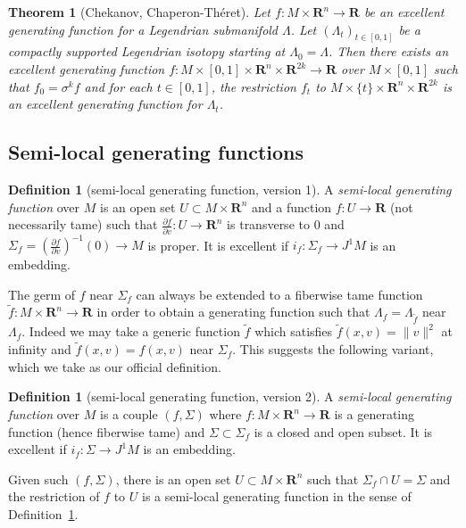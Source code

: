 \documentclass[12pt,a4paper]{article}
\numberwithin{equation}{section}
\newtheorem{thm}[equation]{Theorem}
\theoremstyle{definition}
\newtheorem{dfn}[equation]{Definition}
\theoremstyle{remark}
\newcommand{\R}{\mathbf{R}}
\newcommand{\del}{\partial}
\begin{document}
\begin{thm}[Chekanov, Chaperon-Théret]\label{gen fn homotopy lifting 1}
Let $f:M\times \R^n\to \R$ be an excellent generating function for a Legendrian submanifold $\Lambda$.
Let $(\Lambda_t)_{t\in [0,1]}$ be a compactly supported Legendrian isotopy starting at $\Lambda_0=\Lambda$.
Then there exists an excellent generating function $f:M\times[0,1]\times \R^n\times \R^{2k}\to \R$ over $M\times [0,1]$
such that $f_0=\sigma^k f$ and for each $t\in[0,1]$, the restriction $f_t$ to $M\times \{t\}\times \R^n\times \R^{2k}$ is an excellent generating function for $\Lambda_t$.
\end{thm}

\subsection{Semi-local generating functions}

\begin{dfn}[semi-local generating function, version 1]\label{dfn:semilocalgf1}
A \emph{semi-local generating function} over $M$ is an open set $U \subset M\times \R^n$
and a function $f:U\to \R$ (not necessarily tame) such that $\frac{\del f}{\del v}:U\to \R^n$
is transverse to $0$ and $\Sigma_f=(\frac{\del f}{\del v})^{-1}(0)\to M$ is proper.
It is excellent if $i_f:\Sigma_f \to J^1 M$ is an embedding.
\end{dfn}

The germ of $f$ near $\Sigma_f$ can always be extended to a fiberwise tame function $\tilde{f}:M\times \R^n\to \R$
in order to obtain a generating function such that $\Lambda_f=\Lambda_{\tilde{f}}$ near $\Lambda_f$. Indeed
we may take a generic function $\tilde{f}$ which satisfies $\tilde f(x,v)=\|v\|^2$ at infinity and
$\tilde{f}(x,v)=f(x,v)$ near $\Sigma_f$.
This suggests the following variant, which we take as our official definition.

\begin{dfn} [semi-local generating function, version 2]\label{semilocal gf def}
A \emph{semi-local generating function} over $M$ is a couple $(f,\Sigma)$ where $f:M\times \R^n\to \R$
is a generating function (hence fiberwise tame) and $\Sigma \subset \Sigma_f$ is a closed and open subset.
It is excellent if $i_f:\Sigma \to J^1 M$ is an embedding.
\end{dfn}

Given such $(f,\Sigma)$, there is an open set $U\subset M\times \R^n$ such that $\Sigma_f\cap U=\Sigma$
and the restriction of $f$ to $U$ is a semi-local generating function in the sense of Definition~\ref{dfn:semilocalgf1}.
\end{document}
